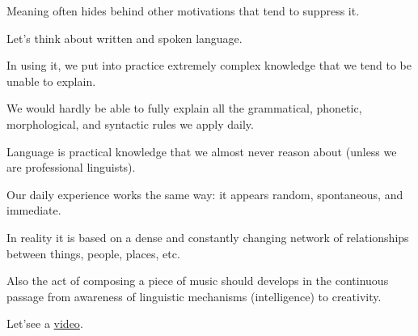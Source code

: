 Meaning often hides behind other motivations that tend to suppress it.

Let's think about written and spoken language.

In using it, we put into practice extremely complex knowledge that we tend to be unable to explain.

We would hardly be able to fully explain all the grammatical, phonetic, morphological, and syntactic rules we apply daily.

Language is practical knowledge that we almost never reason about (unless we are professional linguists).

Our daily experience works the same way: it appears random, spontaneous, and immediate.

In reality it is based on a dense and constantly changing network of relationships between things, people, places, etc.

Also the act of composing a piece of music should develops in the continuous passage from awareness of linguistic mechanisms (intelligence) to creativity.

Let'see a \href{http://www.musicaecodice.it/gitmedia/emc/1_media/senso1.mp4}{video}.